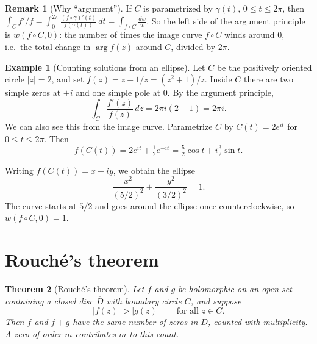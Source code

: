 \documentclass[11pt]{article}
\theoremstyle{plain}
\newtheorem{theorem}{Theorem}[section]
\theoremstyle{definition}
\newtheorem{example}[theorem]{Example}
\theoremstyle{boldremark}
\newtheorem*{remark}{Remark}
\theoremstyle{remark}
\numberwithin{equation}{section}
\begin{document}
\begin{remark}[Why ``argument'']
If $C$ is parametrized by $\gamma(t)$, $0\leq t\leq2\pi$, then
$\int_C f'/f=\int_0^{2\pi}\frac{(f\circ\gamma)'(t)}{f(\gamma(t))}\,dt
=\int_{f\circ C}\frac{dw}{w}$. So the left side of the argument principle
is $w(f\circ C,0)$: the number of times the image curve $f\circ C$ winds
around $0$, i.e.\ the total change in $\arg f(z)$ around $C$, divided by
$2\pi$.
\end{remark}

\begin{example}[Counting solutions from an ellipse]
Let $C$ be the positively oriented circle $|z|=2$, and set
$f(z)=z+1/z=(z^2+1)/z$. Inside $C$ there are two simple zeros at $\pm i$
and one simple pole at $0$. By the argument principle,
\[
 \int_C \frac{f'(z)}{f(z)}\,dz=2\pi i(2-1)=2\pi i.
\]
We can also see this from the image curve. Parametrize $C$ by
$C(t)=2e^{it}$ for $0\le t\le 2\pi$. Then
\[
 f(C(t))=2e^{it}+\tfrac12e^{-it}
        =\tfrac52\cos t+i\tfrac32\sin t.
\]
\begin{minipage}[c]{0.54\linewidth}
Writing $f(C(t))=x+iy$, we obtain the ellipse
\[
 \frac{x^2}{(5/2)^2}+\frac{y^2}{(3/2)^2}=1.
\]
The curve starts at $5/2$ and goes around the ellipse once
counterclockwise, so $w(f\circ C,0)=1$.
\end{minipage}\hfill
\begin{minipage}[c]{0.44\linewidth}
\centering
{}
\end{minipage}
\end{example}
 
\section{Rouch\'e's theorem}
\begin{theorem}[Rouch\'e's theorem]\label{thm:rouche}
Let $f$ and $g$ be holomorphic on an open set containing a closed disc
$\overline D$ with boundary circle $C$, and suppose
\[
 |f(z)|>|g(z)|\qquad\text{for all }z\in C.
\]
Then $f$ and $f+g$ have the same number of zeros in $D$, counted with
multiplicity. A zero of order $m$ contributes $m$ to this count.
\end{theorem}
\end{document}
